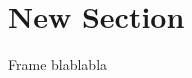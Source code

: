 \documentclass[compress, xcolor=table]{beamer}
\begin{document}
\maketitle
\section{New Section}
\begin{frame}{Frame}
blablabla
\end{frame}
\end{document}
